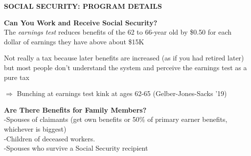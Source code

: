 \documentclass[landscape]{slides}
\begin{document}
\begin{slide}
\begin{center}
{\bf SOCIAL SECURITY: PROGRAM DETAILS}
\end{center}

{\bf Can You Work and Receive Social Security?}\\
The \emph{earnings test} reduces benefits of the 62 to 66-year old by \$0.50 for each dollar of earnings they have above
about \$15K

Not really a tax because later benefits are increased (as if you had retired later) but most people don't
understand the system and perceive the earnings test as a pure tax 

$\Rightarrow$ Bunching at earnings test kink at ages 62-65 (Gelber-Jones-Sacks '19)

{\bf Are There Benefits for Family Members?}\\
-Spouses of claimants (get own benefits or 50\% of primary earner benefits, whichever is biggest)\\
-Children of deceased workers.\\
-Spouses who survive a Social Security recipient

\end{slide}

\begin{slide}

\end{slide}

\begin{slide}

\end{slide}
\end{document}
